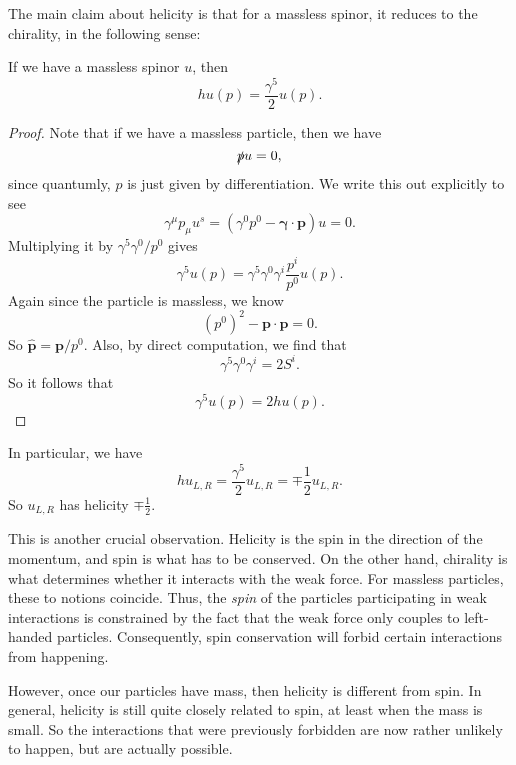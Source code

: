 \documentclass[a4paper]{article}
\begin{document}
The main claim about helicity is that for a massless spinor, it reduces to the chirality, in the following sense:
\begin{prop}
  If we have a massless spinor $u$, then
  \[
    hu(p) = \frac{\gamma^5}{2} u(p).
  \]
\end{prop}

\begin{proof}
  Note that if we have a massless particle, then we have
  \[
    \slashed p u = 0,
  \]
  since quantumly, $p$ is just given by differentiation. We write this out explicitly to see
  \[
    \gamma^\mu p_\mu u^s = (\gamma^0 p^0 - \boldsymbol \gamma \cdot \mathbf{p})u = 0.
  \]
  Multiplying it by $\gamma^5 \gamma^0/p^0$ gives
  \[
    \gamma^5 u(p) = \gamma^5 \gamma^0 \gamma^i \frac{p^i}{p^0} u(p).
  \]
  Again since the particle is massless, we know
  \[
    (p^0)^2 - \mathbf{p}\cdot \mathbf{p} = 0.
  \]
  So $\hat{\mathbf{p}} = \mathbf{p}/p^0$. Also, by direct computation, we find that
  \[
    \gamma^5 \gamma^0 \gamma^i = 2 S^i.
  \]
  So it follows that
  \[
    \gamma^5 u(p) = 2 h u(p).
  \]
\end{proof}
In particular, we have
\[
  h u_{L, R} = \frac{\gamma^5}{2} u_{L, R} = \mp \frac{1}{2} u_{L, R}.
\]
So $u_{L, R}$ has helicity $\mp\frac{1}{2}$.

This is another crucial observation. Helicity is the spin in the direction of the momentum, and spin is what has to be conserved. On the other hand, chirality is what determines whether it interacts with the weak force. For massless particles, these to notions coincide. Thus, the \emph{spin} of the particles participating in weak interactions is constrained by the fact that the weak force only couples to left-handed particles. Consequently, spin conservation will forbid certain interactions from happening.

However, once our particles have mass, then helicity is different from spin. In general, helicity is still quite closely related to spin, at least when the mass is small. So the interactions that were previously forbidden are now rather unlikely to happen, but are actually possible.
\end{document}
